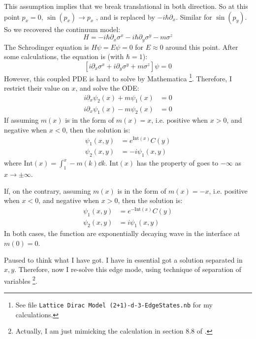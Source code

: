 \documentclass{article}
\begin{document}
    This assumption implies that we break translational in both
    direction. So at this point $p_x=0$, $\sin(p_x)\to p_x$ , and is
    replaced by $-i\hbar \partial _x$. Similar for $\sin(p_y)$. So we
    recovered the continuum model:
    \begin{equation}
        H = -i\hbar\partial_x \sigma^x 
        -i\hbar\partial_y \sigma^y -m \sigma^z
    \end{equation}
    The Schrodinger equation is $H\psi =E\psi = 0$ for $E\approx 0$
    around this point. After some calculations, the equation is (with
    $\hbar=1$):
    \begin{equation}
        \left[i\partial_x \sigma^x + i\partial_y \sigma^y +
        m\sigma^z\right] \psi = 0
    \end{equation}
    However, this coupled PDE is hard to solve by Mathematica
    \footnote{See file \texttt{Lattice Dirac Model
    (2+1)-d-3-EdgeStates.nb} for my calculations.}. Therefore, I
    restrict their value on $x$, and solve the ODE:
    \begin{align}
        i\partial_x \psi_2(x) + m\psi_1(x) &= 0 \\
        i\partial_x \psi_1(x) - m\psi_2(x) &= 0
    \end{align}
    If assuming $m(x)$ is in the form of $m(x)=x$, i.e. positive when
    $x>0$, and negative when $x<0$, then the solution is:
    \begin{align}
        \psi_1 (x,y) &= e^{\text{Int}(x)} C(y) \\
        \psi_2 (x,y) &= -i \psi_1(x,y)
    \end{align}
    where $\text{Int}(x)=\int_1^x -m(k)\dd{k}$. $\text{Int}(x)$ has the
    property of goes to $-\infty$ as $x\to \pm\infty$.

    If, on the contrary, assuming $m(x)$ is in the form of $m(x)=-x$, i.e.
    positive when $x<0$, and negative when $x>0$, then the solution is:
    \begin{align}
        \psi_1 (x,y) &= e^{-\text{Int}(x)} C(y) \\
        \psi_2 (x,y) &= i \psi_1(x,y)
    \end{align}
    In both cases, the function are exponentially decaying wave in the
    interface at $m(0)=0$.

    Paused to think what I have got. I have in essential got a
    solution separated in $x,y$. Therefore, now I re-solve this edge
    mode, using technique of separation of variables 
    \footnote{Actually, I am just mimicking the calculation
    in section 8.8 of \cite{Bernevig2013}.}. 
\end{document}
